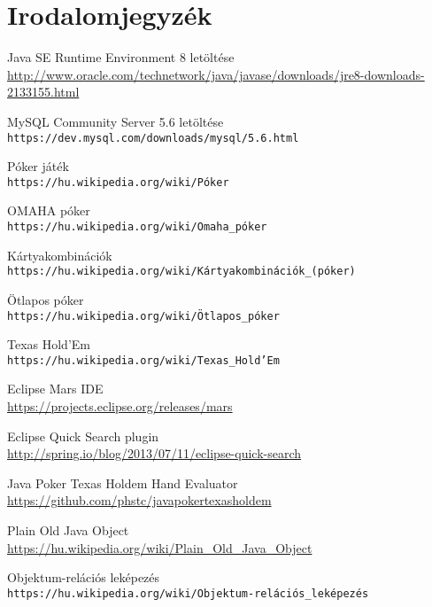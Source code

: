 \part{Irodalomjegyzék}

\begin{thebibliography}{9}

Java SE Runtime Environment 8 letöltése \\
\url{http://www.oracle.com/technetwork/java/javase/downloads/jre8-downloads-2133155.html}

MySQL Community Server 5.6 letöltése \\
\texttt{https://dev.mysql.com/downloads/mysql/5.6.html}

Póker játék \\
\texttt{https://hu.wikipedia.org/wiki/Póker}

OMAHA póker \\
\texttt{https://hu.wikipedia.org/wiki/Omaha\_póker}

Kártyakombinációk \\
\texttt{https://hu.wikipedia.org/wiki/Kártyakombinációk\_(póker)}

Ötlapos póker \\
\texttt{https://hu.wikipedia.org/wiki/Ötlapos\_póker}

Texas Hold'Em \\
\texttt{https://hu.wikipedia.org/wiki/Texas\_Hold'Em}

Eclipse Mars IDE \\
\url{https://projects.eclipse.org/releases/mars}

Eclipse Quick Search plugin \\
\url{http://spring.io/blog/2013/07/11/eclipse-quick-search}

Java Poker Texas Holdem Hand Evaluator \\
\url{https://github.com/phstc/javapokertexasholdem}

Plain Old Java Object \\
\url{https://hu.wikipedia.org/wiki/Plain_Old_Java_Object}

Objektum-relációs leképezés \\
\texttt{https://hu.wikipedia.org/wiki/Objektum-relációs\_leképezés}


\end{thebibliography}
